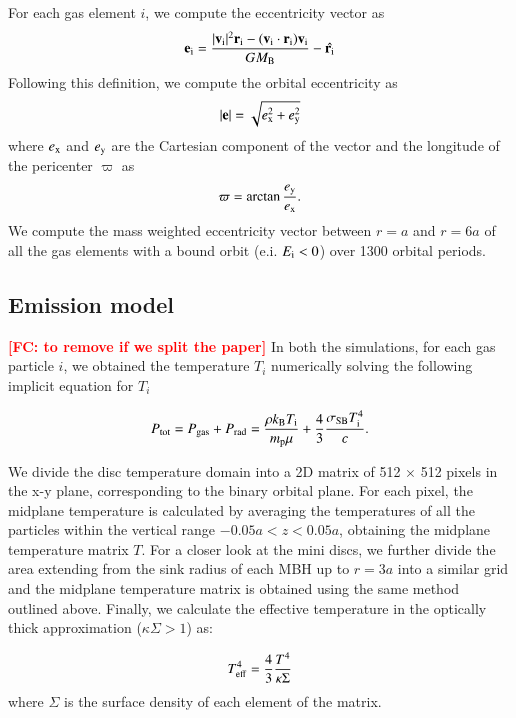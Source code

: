 \documentclass{aa}
\newcommand{\fc}[1]{\textcolor{red}{\bf [FC: #1]}}
\begin{document}
For each gas element $i$, we compute the eccentricity vector as
\begin{equation}
    \label{eqn:ecc}
     \mathbf{e}_{\rm i} = \frac{|\mathbf{v}_{\rm i}|^2\mathbf{r}_{\rm i}-(\mathbf{v}_{\rm i} \cdot \mathbf{r}_{\rm i})\mathbf{v}_{\rm i}}{GM_{\rm B}}-\hat{\mathbf{r}_{\rm i}}
\end{equation}
Following this definition, we compute the orbital eccentricity as
\begin{equation}
    |\mathbf{e}| = \sqrt{e_{\rm x}^2+e_{\rm y}^2}
\end{equation}
where $e_{\rm x}$ and $e_{\rm y}$ are the Cartesian component of the vector and the longitude of the pericenter $\varpi $ as 
\begin{equation}
    \varpi = \arctan \frac{e_{\rm y}}{e_{\rm x}}.
\end{equation}
We compute the mass weighted eccentricity vector between $r=a$ and $r=6a$ of all the gas elements with a bound orbit (e.i. $E_{\rm i}<0$) over 1300 orbital periods.


\subsection{Emission model}
\label{Emission model}
\fc{to remove if we split the paper}
In both the simulations, for each gas particle $i$, we obtained the temperature $T_{i}$ numerically solving the following implicit equation for $T_{i}$ 

\begin{equation}
    \label{eqn:Ptot}
    P_{\rm tot} = P_{\rm gas} + P_{\rm rad} = \frac{\rho k_{\rm B} T_{\rm i}}{m_{\rm p}\mu} + \frac{4}{3}\frac{\sigma_{\rm SB} T_{\rm i}^4}{c}.
\end{equation}

We divide the disc temperature domain into a 2D matrix of 512 $\times$ 512 pixels in the x-y plane, corresponding to the binary orbital plane. For each pixel, the midplane temperature is calculated by averaging the temperatures of all the particles within the vertical range $-0.05a < z < 0.05a$, obtaining the midplane temperature matrix $T$. For a closer look at the mini discs, we further divide the area extending from the sink radius of each MBH up to $r=3a$ into a similar grid and the midplane temperature matrix is obtained using the same method outlined above. Finally, we calculate the effective temperature in the optically thick approximation ($\kappa\Sigma > 1 $) as: 

\begin{equation}
    \label{eqn:Teff}
    T_{\rm eff}^4 = \frac{4}{3}\frac{T^4}{\kappa \Sigma}
\end{equation}
where $\Sigma$ is the surface density of each element of the matrix.
\end{document}
